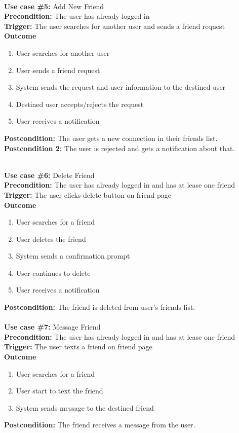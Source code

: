 \documentclass[12pt]{article}
\begin{document}
\noindent\\
\textbf{Use case \#5:} Add New Friend\\
\textbf{Precondition:} The user has already logged in\\
\textbf{Trigger:} The user searches for another user and sends a friend request\\
\textbf{Outcome}
\begin{enumerate}
	\item User searches for another user
    \item User sends a friend request
    \item System sends the request and user information to the destined user
    \item Destined user accepts/rejects the request
    \item User receives a notification
\end{enumerate}
\textbf{Postcondition:} The user gets a new connection in their friends list.\\
\textbf{Postcondition 2:} The user is rejected and gets a notification about that.


\noindent\\
\textbf{Use case \#6:} Delete Friend\\
\textbf{Precondition:} The user has already logged in and has at lease one friend\\
\textbf{Trigger:} The user clicks delete button on friend page\\
\textbf{Outcome}
\begin{enumerate}
	\item User searches for a friend
    \item User deletes the friend
    \item System sends a confirmation prompt
    \item User continues to delete
    \item User receives a notification
\end{enumerate}
\textbf{Postcondition:} The friend is deleted from user's friends list.\\


\noindent\\
\textbf{Use case \#7:} Message Friend\\
\textbf{Precondition:} The user has already logged in and has at lease one friend\\
\textbf{Trigger:} The user texts a friend on friend page\\
\textbf{Outcome}
\begin{enumerate}
	\item User searches for a friend
    \item User start to text the friend
    \item System sends message to the destined friend
\end{enumerate}
\textbf{Postcondition:} The friend receives a message from the user.\\
\end{document}
